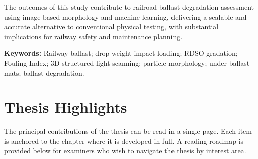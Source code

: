 \bigskip

The outcomes of this study contribute to railroad ballast degradation
assessment using image-based morphology and machine learning, delivering a
scalable and accurate alternative to conventional physical testing, with
substantial implications for railway safety and maintenance planning.

\bigskip

\textbf{Keywords:} Railway ballast; drop-weight impact loading;
\gls{RDSO} gradation; Fouling Index; 3D structured-light scanning; particle
morphology; under-ballast mats; ballast degradation.

\endgroup

\cleardoublepage
\chapter*{Thesis Highlights}
\thispagestyle{plain}

\begingroup
\setlength{\parindent}{0pt}

The principal contributions of the thesis can be read in a single page.
Each item is anchored to the chapter where it is developed in full.
A reading roadmap is provided below for examiners who wish to navigate
the thesis by interest area.

